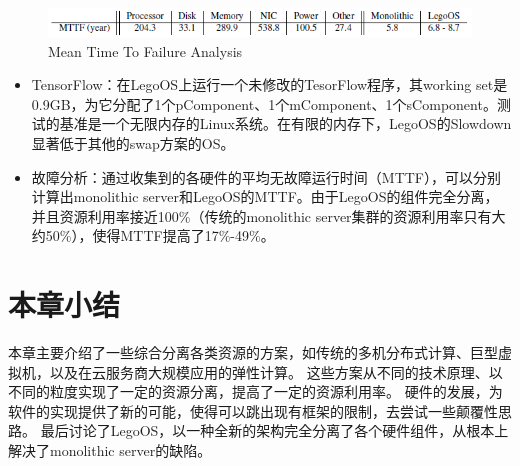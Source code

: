 \begin{figure}[h]
\centering
\includegraphics[scale=0.75]{Figures/system/failure_analysis.png}
\decoRule
\caption{Mean Time To Failure Analysis}
\label{fig:failure_analysis}
\end{figure}

\begin{itemize}
\item TensorFlow：在LegoOS上运行一个未修改的TesorFlow程序，其working set是0.9GB，为它分配了1个pComponent、1个mComponent、1个sComponent。测试的基准是一个无限内存的Linux系统。在有限的内存下，LegoOS的Slowdown显著低于其他的swap方案的OS。
\item 故障分析：通过收集到的各硬件的平均无故障运行时间（MTTF），可以分别计算出monolithic server和LegoOS的MTTF。由于LegoOS的组件完全分离，并且资源利用率接近100\%（传统的monolithic server集群的资源利用率只有大约50\%），使得MTTF提高了17\%-49\%。
\end{itemize}


\section{本章小结}

本章主要介绍了一些综合分离各类资源的方案，如传统的多机分布式计算、巨型虚拟机，以及在云服务商大规模应用的弹性计算。
这些方案从不同的技术原理、以不同的粒度实现了一定的资源分离，提高了一定的资源利用率。
硬件的发展，为软件的实现提供了新的可能，使得可以跳出现有框架的限制，去尝试一些颠覆性思路。
最后讨论了LegoOS，以一种全新的架构完全分离了各个硬件组件，从根本上解决了monolithic server的缺陷。
